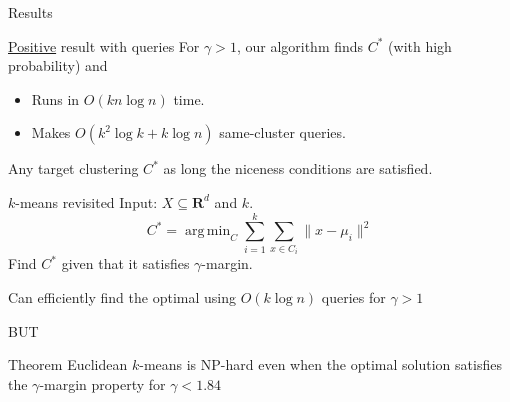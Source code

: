 \documentclass{beamer}
\newcommand{\mb}{\mathbf}
\DeclareMathOperator*{\argmin}{arg\,min}
\begin{document}
\begin{frame}[label=queryPositive]{Results}

	\begin{block}{\hyperlink{resultQueryPositive}{Positive} result with queries}
		\vspace{10pt}For $\gamma > 1$, our algorithm finds $C^*$ (with high probability) and 
		\begin{itemize}
		\vspace{10pt}\item Runs in $O(kn\log n)$ time.
        \vspace{10pt}\item Makes $O(k^2\log k + k\log n)$ same-cluster queries.
		\end{itemize}
	\end{block}
	
	\vspace{20pt}Any target clustering $C^*$ as long the niceness conditions are satisfied. 
\end{frame}

\begin{frame}{$k$-means revisited}
	Input: $X \subseteq \mb R^d$ and $k$.
	\vspace{-10pt}$$C^* = \argmin_{C} \sum_{i=1}^k \sum_{x \in C_i} \|x - \mu_i\|^2$$
	\vspace{10pt}Find $C^*$ given that it satisfies $\gamma$-margin.
	
	\vspace{20pt} {\color{blue}Can efficiently find the optimal using $O(k\log n)$ queries for $\gamma > 1$}
	\begin{center}
		\alert{BUT}
	\end{center}	
	\begin{block}{Theorem}
	Euclidean $k$-means is NP-hard even when the optimal solution satisfies the $\gamma$-margin property for $\gamma < 1.84$
	\end{block}
	
\end{frame}
\end{document}
